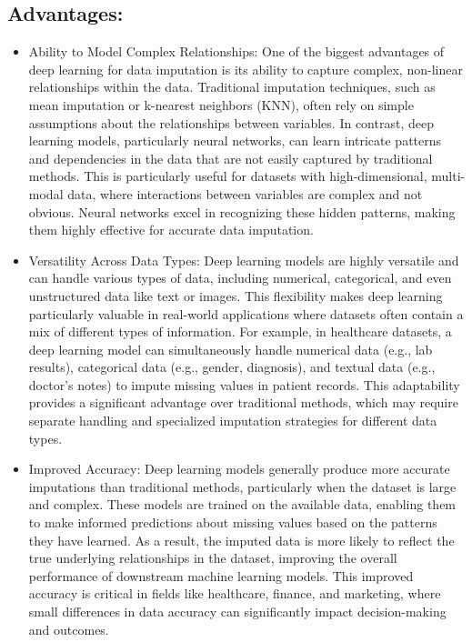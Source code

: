 \documentclass{article}
\begin{document}
\subsection{Advantages:}
\begin{itemize}
\item Ability to Model Complex Relationships:
One of the biggest advantages of deep learning for data imputation is its ability to capture complex, non-linear relationships within the data. Traditional imputation techniques, such as mean imputation or k-nearest neighbors (KNN), often rely on simple assumptions about the relationships between variables. In contrast, deep learning models, particularly neural networks, can learn intricate patterns and dependencies in the data that are not easily captured by traditional methods. This is particularly useful for datasets with high-dimensional, multi-modal data, where interactions between variables are complex and not obvious. Neural networks excel in recognizing these hidden patterns, making them highly effective for accurate data imputation.
\item Versatility Across Data Types:
Deep learning models are highly versatile and can handle various types of data, including numerical, categorical, and even unstructured data like text or images. This flexibility makes deep learning particularly valuable in real-world applications where datasets often contain a mix of different types of information. For example, in healthcare datasets, a deep learning model can simultaneously handle numerical data (e.g., lab results), categorical data (e.g., gender, diagnosis), and textual data (e.g., doctor’s notes) to impute missing values in patient records. This adaptability provides a significant advantage over traditional methods, which may require separate handling and specialized imputation strategies for different data types.

\item Improved Accuracy:
Deep learning models generally produce more accurate imputations than traditional methods, particularly when the dataset is large and complex. These models are trained on the available data, enabling them to make informed predictions about missing values based on the patterns they have learned. As a result, the imputed data is more likely to reflect the true underlying relationships in the dataset, improving the overall performance of downstream machine learning models. This improved accuracy is critical in fields like healthcare, finance, and marketing, where small differences in data accuracy can significantly impact decision-making and outcomes.


\end{itemize}
\end{document}
